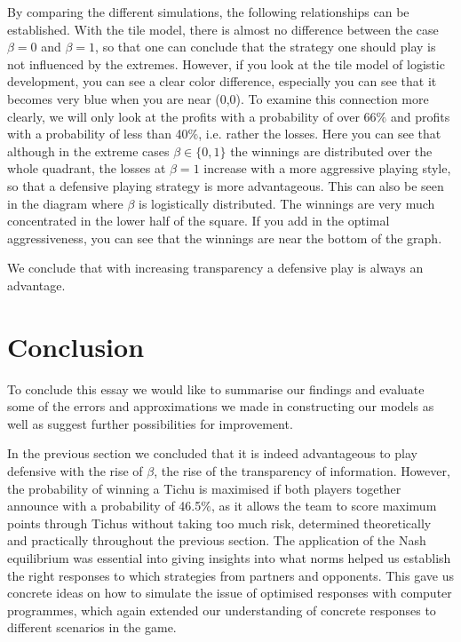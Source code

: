 By comparing the different simulations, the following relationships can be established. With the tile model, there is almost no difference between the case $\beta=0$ and $\beta=1$, so that one can conclude that the strategy one should play is not influenced by the extremes. However, if you look at the tile model of logistic development, you can see a clear color difference, especially you can see that it becomes very blue when you are near (0,0). To examine this connection more clearly, we will only look at the profits with a probability of over 66$\%$ and profits with a probability of less than 40$\%$, i.e. rather the losses. Here you can see that although in the extreme cases $\beta\in\{0,1\}$ the winnings are distributed over the whole quadrant, the losses at $\beta=1$ increase with a more aggressive playing style, so that a defensive playing strategy is more advantageous. This can also be seen in the diagram where $\beta$ is logistically distributed. The winnings are very much concentrated in the lower half of the square. If you add in the optimal aggressiveness, you can see that the winnings are near the bottom of the graph.

We conclude that with increasing transparency a defensive play is always an advantage.


\section{Conclusion}
To conclude this essay we would like to summarise our findings and evaluate some of the errors and approximations we made in constructing our models as well as suggest further possibilities for improvement.

In the previous section we concluded that it is indeed advantageous to play defensive with the rise of $\beta$, the rise of the transparency of information. However, the probability of winning a Tichu is maximised if both players together announce with a probability of 46.5$\%$, as it allows the team to score maximum points through Tichus without taking too much risk, determined theoretically and practically throughout the previous section. The application of the Nash equilibrium was essential into giving insights into what norms helped us establish the right responses to which strategies from partners and opponents. This gave us concrete ideas on how to simulate the issue of optimised responses with computer programmes, which again extended our understanding of concrete responses to different scenarios in the game.

